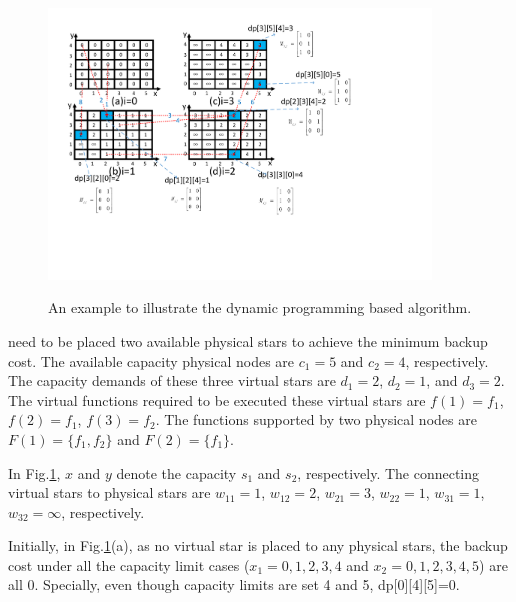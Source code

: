 \begin{figure}
\centering
\includegraphics[width=4in]{Fig/DPIllustration}\\
  \caption{An example to illustrate the dynamic programming based algorithm.} %
  \label{fig:DPIllustration}
\end{figure}



  need to be placed  two available physical stars to achieve the minimum backup  cost. The available capacity  physical nodes are $c_1=5$ and $c_2=4$, respectively. The capacity demands of these three virtual stars are $d_1=2$, $d_2=1$, and $d_3=2$. The virtual functions required to be executed  these virtual stars are $f(1)=f_1$, $f(2)=f_1$, $f(3)=f_2$. The functions supported by  two physical nodes are $F(1)=\{f_1,f_2\}$ and $F(2)=\{f_1\}$.

In Fig.\ref{fig:DPIllustration}, $x$ and $y$  denote the capacity  $s_1$ and $s_2$, respectively.  The   connecting virtual stars to physical stars are $w_{11}=1$, $w_{12}=2$, $w_{21}=3$, $w_{22}=1$, $w_{31}=1$, $w_{32}=\infty$, respectively.


Initially, in Fig.\ref{fig:DPIllustration}(a), as no virtual star is placed to any physical stars, the backup cost under all the capacity limit cases ($x_1=0, 1, 2, 3, 4$ and $x_2=0, 1, 2, 3, 4, 5$)  are all 0. Specially, even though capacity limits are set 4 and 5, dp[0][4][5]=0. 

